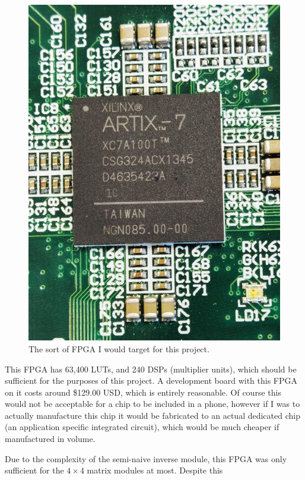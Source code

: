 \documentclass[12pt]{article}
\begin{document}
\begin{figure}[thp]
	\centering
	
	\includegraphics[width=\textwidth]{tim_xilinx.jpg}
	
	\caption{The sort of FPGA I would target for this project.}
	\label{tim_xilinx}
\end{figure}

This FPGA has 63,400 LUTs, and 240 DSPs (multiplier units), which should be sufficient for the purposes of this project. A development board with this FPGA on it costs around \$129.00 USD, which is entirely reasonable. Of course this would not be acceptable for a chip to be included in a phone, however if I was to actually manufacture this chip it would be fabricated to an actual dedicated chip (an application specific integrated circuit), which would be much cheaper if manufactured in volume.

Due to the complexity of the semi-naive inverse module, this FPGA was only sufficient for the $4 \times 4$ matrix modules at most. Despite this 
\end{document}
